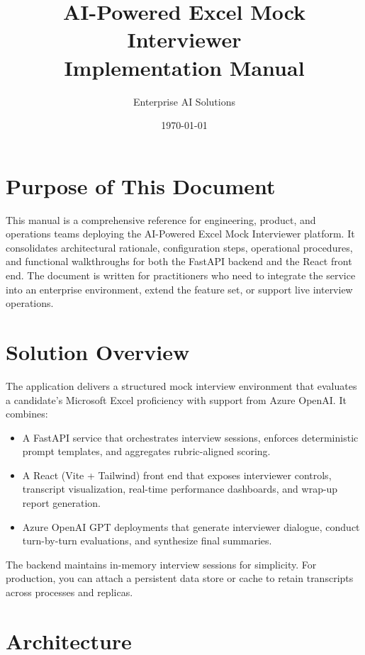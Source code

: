 \documentclass[11pt]{article}
\title{AI-Powered Excel Mock Interviewer\\Implementation Manual}
\author{Enterprise AI Solutions}
\date{\today}
\begin{document}
\maketitle
\tableofcontents
\newpage

\section{Purpose of This Document}
This manual is a comprehensive reference for engineering, product, and operations teams deploying the AI-Powered Excel Mock Interviewer platform. It consolidates architectural rationale, configuration steps, operational procedures, and functional walkthroughs for both the FastAPI backend and the React front end. The document is written for practitioners who need to integrate the service into an enterprise environment, extend the feature set, or support live interview operations.

\section{Solution Overview}
The application delivers a structured mock interview environment that evaluates a candidate's Microsoft Excel proficiency with support from Azure OpenAI. It combines:
\begin{itemize}[leftmargin=*]
  \item A FastAPI service that orchestrates interview sessions, enforces deterministic prompt templates, and aggregates rubric-aligned scoring.
  \item A React (Vite + Tailwind) front end that exposes interviewer controls, transcript visualization, real-time performance dashboards, and wrap-up report generation.
  \item Azure OpenAI GPT deployments that generate interviewer dialogue, conduct turn-by-turn evaluations, and synthesize final summaries.
\end{itemize}
The backend maintains in-memory interview sessions for simplicity. For production, you can attach a persistent data store or cache to retain transcripts across processes and replicas.

\section{Architecture}
\end{document}
